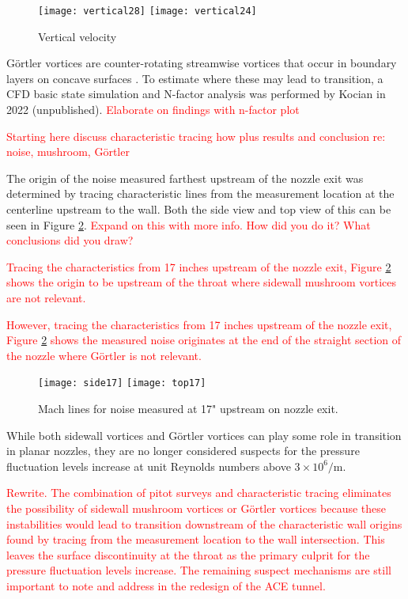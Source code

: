 \begin{figure}[ht!]
    \centering
    \texttt{[image: vertical28]}
    \texttt{[image: vertical24]}
    \caption{Vertical velocity}
    \label{fig:vertical-vel}
\end{figure}

Görtler vortices are counter-rotating streamwise vortices that occur in boundary layers on concave surfaces \cite{saric}. To estimate where these may lead to transition, a CFD basic state simulation and N-factor analysis was performed by Kocian in 2022 (unpublished). \textcolor{red}{Elaborate on findings with n-factor plot}

\textcolor{red}{Starting here discuss characteristic tracing how plus results and conclusion re: noise, mushroom, Görtler}

The origin of the noise measured farthest upstream of the nozzle exit was determined by tracing characteristic lines from the measurement location at the centerline upstream to the wall. Both the side view and top view of this can be seen in Figure \ref{fig:machlines}. \textcolor{red}{Expand on this with more info. How did you do it? What conclusions did you draw?}

\textcolor{red}{Tracing the characteristics from 17 inches upstream of the nozzle exit, Figure \ref{fig:machlines} shows the origin to be upstream of the throat where sidewall mushroom vortices are not relevant.}

\textcolor{red}{However, tracing the characteristics from 17 inches upstream of the nozzle exit, Figure \ref{fig:machlines} shows the measured noise originates at the end of the straight section of the nozzle where Görtler is not relevant.}

\begin{figure}[ht!]
    \centering
    \texttt{[image: side17]}
    \texttt{[image: top17]}
    \caption{Mach lines for noise measured at 17" upstream on nozzle exit.}
    \label{fig:machlines}
\end{figure}

While both sidewall vortices and Görtler vortices can play some role in transition in planar nozzles, they are no longer considered suspects for the pressure fluctuation levels increase at unit Reynolds numbers above $3 \times 10^6/\mathrm{m}$.

\textcolor{red}{Rewrite. The combination of pitot surveys and characteristic tracing eliminates the possibility of sidewall mushroom vortices or Görtler vortices because these instabilities would lead to transition downstream of the characteristic wall origins found by tracing from the measurement location to the wall intersection. This leaves the surface discontinuity at the throat as the primary culprit for the pressure fluctuation levels increase. The remaining suspect mechanisms are still important to note and address in the redesign of the ACE tunnel.}

